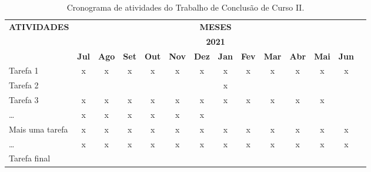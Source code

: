 \begin{table}[h]
	\caption{Cronograma de atividades do Trabalho de Conclusão de Curso II.}
\centering
\fontsize{5}{11}\selectfont
\begin{tabular}{|l|c|c|c|c|c|c|c|c|c|c|c|c|c|}
\hline
\multicolumn{1}{|c|}{\multirow{3}{*}{\textbf{ATIVIDADES}}} & \multicolumn{12}{c|}{\textbf{MESES}}                                                                          \\ \cline{2-13} 
\multicolumn{1}{|c|}{}                                     & \multicolumn{12}{c|}{\textbf{2021}}                                                                        \\ \cline{2-13} 
\multicolumn{1}{|c|}{}     & \multicolumn{1}{l|}{\textbf{Jul}} & \multicolumn{1}{l|}{\textbf{Ago}} & \multicolumn{1}{l|}{\textbf{Set}} & \multicolumn{1}{l|}{\textbf{Out}} & \multicolumn{1}{l|}{\textbf{Nov}} & \multicolumn{1}{l|}{\textbf{Dez}} & \multicolumn{1}{l|}{\textbf{Jan}} & \multicolumn{1}{l|}{\textbf{Fev}} & \multicolumn{1}{l|}{\textbf{Mar}} & \multicolumn{1}{l|}{\textbf{Abr}} & \multicolumn{1}{l|}{\textbf{Mai}} & \multicolumn{1}{l|}{\textbf{Jun}}  \\ \hline
Tarefa 1 & x& x& x& x& x& x& x& x& x& x& x& x \\ \hline
Tarefa 2& & & & & & & x & & & & & \\ \hline
Tarefa 3&x &x &x &x &x  &x  &x  &x  &x  &x  & x &  \\ \hline
\ldots &x &x &x &x &x  &x  &  &  &  &  &  &  \\ \hline
Mais uma tarefa &x &x &x &x &x &x &x &x &x &x &x &x  \\ \hline
\ldots&x &x &x &x &x  &x  &x  &x  &x  &x  &x  &x  \\ \hline
Tarefa final & & & & & & & & & & & &\\ \hline
\end{tabular}
\label{tab:cronograma}
\end{table}


